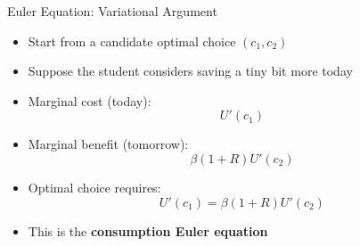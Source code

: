 \documentclass[10pt,aspectratio=169]{beamer}
\begin{document}
\begin{frame}{Euler Equation: Variational Argument}

\begin{itemize}
    \item Start from a candidate optimal choice \((c_1, c_2)\)
    \vspace{0.2cm}
    
    \item Suppose the student considers saving a tiny bit more today
    \vspace{0.2cm}
    
    \item Marginal cost (today):
    \[
    U'(c_1)
    \]
    
    \item Marginal benefit (tomorrow):
    \[
    \beta (1+R) U'(c_2)
    \]
    
    \item Optimal choice requires:
    \[
    U'(c_1) = \beta (1+R) U'(c_2)
    \]
    
    \item This is the \textbf{consumption Euler equation}
\end{itemize}

\end{frame}
\end{document}
